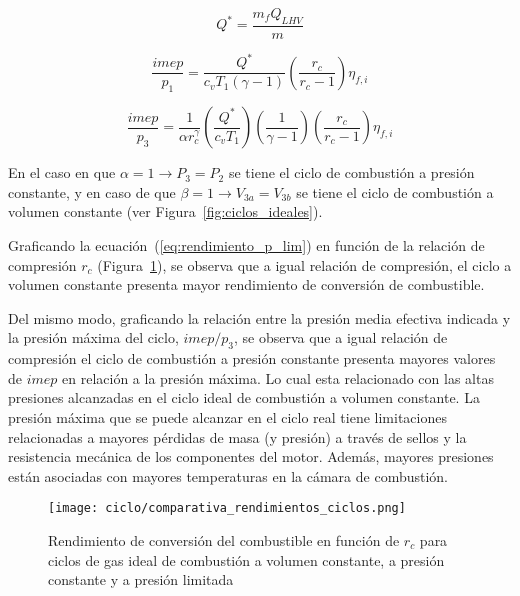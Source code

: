 \begin{equation}
    \label{eq:Q*} Q^{*}=  \frac{m_{f}Q_{LHV}}{m}
\end{equation}



\begin{equation}
    \label{eq:imep_p1} \frac{imep}{p_1} = \frac{Q^*}{c_v T_1 (\gamma-1)} \left( \frac{r_c}{r_c-1} \right) \eta_{f,i}
\end{equation}

\begin{equation}
    \label{eq:imep_p3} \frac{imep}{p_3} = \frac{1}{\alpha r_c^\gamma} \left( \frac{Q^*}{c_v T_1} \right) \left(\frac{1}{\gamma-1} \right) \left( \frac{r_c}{r_c-1} \right) \eta_{f,i}
\end{equation}

En el caso en que  $\alpha=1 \rightarrow P_3=P_2$ se tiene el ciclo de
combustión a presión constante, y en caso de que
$\beta=1 \rightarrow V_{3a}=V_{3b}$ se tiene el ciclo de combustión a volumen
constante (ver Figura~\ref{fig:ciclos_ideales}).

Graficando la ecuación~(\ref{eq:rendimiento_p_lim}) en función de la relación de
compresión $r_c$ (Figura~\ref{fig:rendimientos}), se observa que a igual
relación de compresión, el ciclo a volumen constante presenta mayor rendimiento
de conversión de combustible.

Del mismo modo, graficando la relación entre la presión media efectiva indicada
y la presión máxima del ciclo, $imep/p_3$, se observa que a igual relación de
compresión el ciclo de combustión a presión constante presenta mayores valores
de $imep$ en relación a la presión máxima.
%
Lo cual esta relacionado con las altas presiones alcanzadas en el ciclo ideal de
combustión a volumen constante.
%
La presión máxima que se puede alcanzar en el ciclo real tiene limitaciones
relacionadas a mayores pérdidas de masa (y presión) a través de sellos y la
resistencia mecánica de los componentes del motor.
%
Además, mayores presiones están asociadas con mayores temperaturas en la cámara
de combustión.

\begin{figure} \centering
\texttt{[image: ciclo/comparativa\_rendimientos\_ciclos.png]}
    \caption{Rendimiento de conversión del combustible en función de $r_c$ para
ciclos de gas ideal de combustión a volumen constante, a presión constante y a
presión limitada~\parencite{heywood}} \label{fig:rendimientos}
\end{figure}


